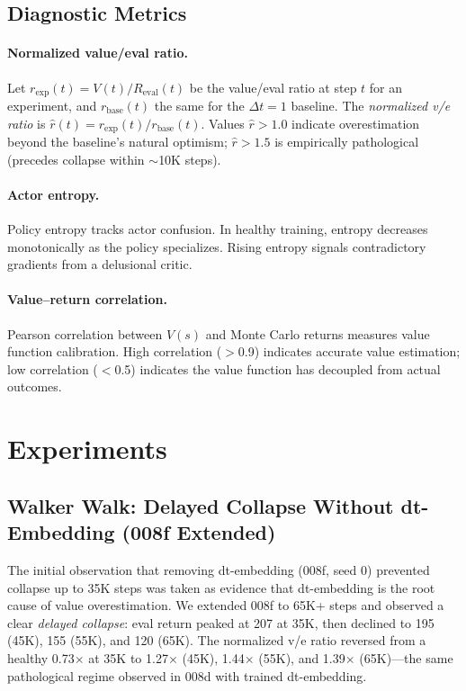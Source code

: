 \documentclass[10pt,letterpaper]{article}
\newcommand{\dt}{\Delta t}
\begin{document}
\subsection{Diagnostic Metrics}

\paragraph{Normalized value/eval ratio.}
Let $r_{\text{exp}}(t) = V(t)/R_{\text{eval}}(t)$ be the value/eval ratio at step $t$ for an experiment, and $r_{\text{base}}(t)$ the same for the $\dt=1$ baseline.
The \emph{normalized v/e ratio} is $\hat{r}(t) = r_{\text{exp}}(t) / r_{\text{base}}(t)$.
Values $\hat{r} > 1.0$ indicate overestimation beyond the baseline's natural optimism; $\hat{r} > 1.5$ is empirically pathological (precedes collapse within $\sim$10K steps).

\paragraph{Actor entropy.}
Policy entropy tracks actor confusion.
In healthy training, entropy decreases monotonically as the policy specializes.
Rising entropy signals contradictory gradients from a delusional critic.

\paragraph{Value--return correlation.}
Pearson correlation between $V(s)$ and Monte Carlo returns measures value function calibration.
High correlation ($>$0.9) indicates accurate value estimation; low correlation ($<$0.5) indicates the value function has decoupled from actual outcomes.

\section{Experiments}\label{sec:experiments}

\subsection{Walker Walk: Delayed Collapse Without dt-Embedding (008f Extended)}\label{sec:008f}

The initial observation that removing dt-embedding (008f, seed 0) prevented collapse up to 35K steps was taken as evidence that dt-embedding is the root cause of value overestimation.
We extended 008f to 65K+ steps and observed a clear \emph{delayed collapse}: eval return peaked at 207 at 35K, then declined to 195 (45K), 155 (55K), and 120 (65K).
The normalized v/e ratio reversed from a healthy 0.73$\times$ at 35K to 1.27$\times$ (45K), 1.44$\times$ (55K), and 1.39$\times$ (65K)---the same pathological regime observed in 008d with trained dt-embedding.
\end{document}
